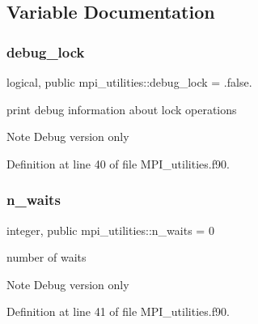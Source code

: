 \subsection{Variable Documentation}
\mbox{\label{namespacempi__utilities_a98291c400747762ea4e3f0d751c5d5f5}} 
\subsubsection{\texorpdfstring{debug\+\_\+lock}{debug\_lock}}
{\footnotesize\ttfamily logical, public mpi\+\_\+utilities\+::debug\+\_\+lock = .false.}



print debug information about lock operations 

\begin{DoxyNote}{Note}
Debug version only 
\end{DoxyNote}


Definition at line 40 of file M\+P\+I\+\_\+utilities.\+f90.

\mbox{\label{namespacempi__utilities_a38a87fa6a7efbd985592bbef4750f02b}} 
\subsubsection{\texorpdfstring{n\+\_\+waits}{n\_waits}}
{\footnotesize\ttfamily integer, public mpi\+\_\+utilities\+::n\+\_\+waits = 0}



number of waits 

\begin{DoxyNote}{Note}
Debug version only 
\end{DoxyNote}


Definition at line 41 of file M\+P\+I\+\_\+utilities.\+f90.

